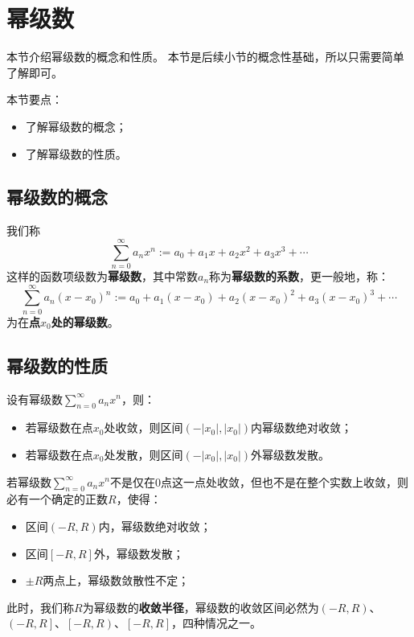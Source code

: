 \section{幂级数}

本节介绍幂级数的概念和性质。
本节是后续小节的概念性基础，所以只需要简单了解即可。

本节要点：
\begin{itemize}
    \item 了解幂级数的概念；
    \item 了解幂级数的性质。
\end{itemize}

\subsection{幂级数的概念}

\begin{definition}[幂级数]
我们称
\[
\sum_{n=0}^{\infty}{a_nx^n}:=a_0+a_1x+a_2x^2+a_3x^3+\cdots
\]
这样的函数项级数为{\bf 幂级数}，其中常数$a_n$称为{\bf 幂级数的系数}，更一般地，称：
\[
\sum_{n=0}^{\infty}{a_n\left( x-x_0 \right) ^n}:=a_0+a_1\left( x-x_0 \right) +a_2\left( x-x_0 \right) ^2+a_3\left( x-x_0 \right) ^3+\cdots
\]
为在{\bf 点$x_0$处的幂级数}。
\end{definition}

\subsection{幂级数的性质}

\begin{theorem}
设有幂级数$\sum_{n=0}^{\infty}{a_nx^n}$，则：
\begin{itemize}
    \item 若幂级数在点$x_0$处收敛，则区间$\left( -\left| x_0 \right|,\left| x_0 \right| \right) $内幂级数绝对收敛；
    \item 若幂级数在点$x_0$处发散，则区间$\left( -\left| x_0 \right|,\left| x_0 \right| \right) $外幂级数发散。
\end{itemize}
\end{theorem}

\begin{corollary}
若幂级数$\sum_{n=0}^{\infty}{a_nx^n}$不是仅在0点这一点处收敛，但也不是在整个实数上收敛，则必有一个确定的正数$R$，使得：
\begin{itemize}
    \item 区间$\left( -R,R \right) $内，幂级数绝对收敛；
    \item 区间$\left[ -R,R \right] $外，幂级数发散；
    \item $\pm R$两点上，幂级数敛散性不定；
\end{itemize}
此时，我们称$R$为幂级数的{\bf 收敛半径}，幂级数的收敛区间必然为$\left( -R,R \right) $、$\left( -R,R \right] $、$\left[ -R,R \right) $、$\left[ -R,R \right] $，四种情况之一。
\end{corollary}

